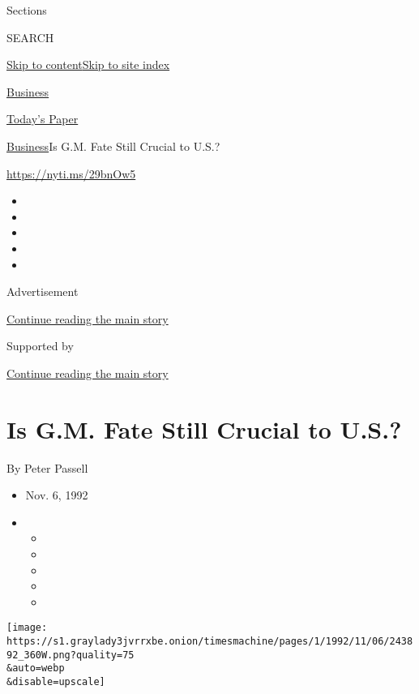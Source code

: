 Sections

SEARCH

\protect\hyperlink{site-content}{Skip to
content}\protect\hyperlink{site-index}{Skip to site index}

\href{https://www.nytimes3xbfgragh.onion/section/business}{Business}

\href{https://myaccount.nytimes3xbfgragh.onion/auth/login?response_type=cookie\&client_id=vi}{}

\href{https://www.nytimes3xbfgragh.onion/section/todayspaper}{Today's
Paper}

\href{/section/business}{Business}\textbar{}Is G.M. Fate Still Crucial
to U.S.?

\href{https://nyti.ms/29bnOw5}{https://nyti.ms/29bnOw5}

\begin{itemize}
\item
\item
\item
\item
\item
\end{itemize}

Advertisement

\protect\hyperlink{after-top}{Continue reading the main story}

Supported by

\protect\hyperlink{after-sponsor}{Continue reading the main story}

\hypertarget{is-gm-fate-still-crucial-to-us}{%
\section{Is G.M. Fate Still Crucial to
U.S.?}\label{is-gm-fate-still-crucial-to-us}}

By Peter Passell

\begin{itemize}
\item
  Nov. 6, 1992
\item
  \begin{itemize}
  \item
  \item
  \item
  \item
  \item
  \end{itemize}
\end{itemize}

\texttt{[image: https://s1.graylady3jvrrxbe.onion/timesmachine/pages/1/1992/11/06/243892\_360W.png?quality=75\\\&auto=webp\\\&disable=upscale]}


